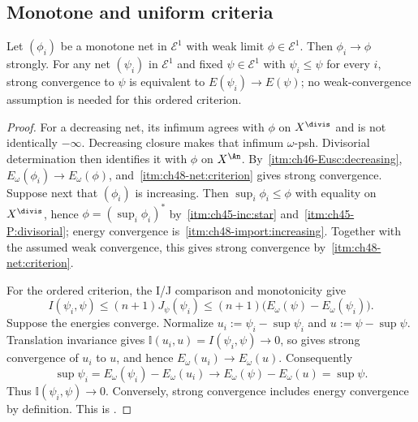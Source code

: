 \subsection{Monotone and uniform criteria}
\label{sec:ch48-monotone}

\begin{proposition}\label{prop:bj-strong-monotone}
Let $(\phi_i)$ be a monotone net in $\mathcal E^1$ with weak limit
$\phi\in\mathcal E^1$. Then $\phi_i\to\phi$ strongly.
For any net $(\psi_i)$ in $\mathcal E^1$ and fixed
$\psi\in\mathcal E^1$ with $\psi_i\le\psi$ for every $i$,
strong convergence to $\psi$ is equivalent to
$E(\psi_i)\to E(\psi)$; no weak-convergence assumption is needed
for this ordered criterion.
\end{proposition}

\begin{proof}
For a decreasing net, its infimum agrees with $\phi$ on
$X^{\divis}$ and is not identically $-\infty$. Decreasing closure
 makes that infimum $\omega$-psh.
Divisorial determination then identifies it with $\phi$ on $X^{\An}$.  By
\,\cref{itm:ch46-Eusc:decreasing},
$E_\omega(\phi_i)\to E_\omega(\phi)$, and
\,\cref{itm:ch48-net:criterion} gives strong
convergence.  Suppose next that $(\phi_i)$ is increasing.  Then
$\sup_i\phi_i\le\phi$ with equality on $X^{\divis}$, hence
$\phi=(\sup_i\phi_i)^*$ by
\,\cref{itm:ch45-inc:star} and
\,\cref{itm:ch45-P:divisorial}; energy
convergence is
\,\cref{itm:ch48-import:increasing}.
Together with the assumed weak convergence, this gives strong convergence
by \,\cref{itm:ch48-net:criterion}.

For the ordered criterion, the I/J comparison and monotonicity give
\[
 I(\psi_i,\psi)\le(n+1)J_\psi(\psi_i)
 \le(n+1)\bigl(E_\omega(\psi)-E_\omega(\psi_i)\bigr).
\]
Suppose the energies converge. Normalize
$u_i:=\psi_i-\sup\psi_i$ and $u:=\psi-\sup\psi$.
Translation invariance gives $\mathbb I(u_i,u)=I(\psi_i,\psi)\to0$,
so  gives strong convergence of $u_i$
to $u$, and hence $E_\omega(u_i)\to E_\omega(u)$. Consequently
\[
 \sup\psi_i=E_\omega(\psi_i)-E_\omega(u_i)
 \longrightarrow E_\omega(\psi)-E_\omega(u)=\sup\psi.
\]
Thus $\mathbb I(\psi_i,\psi)\to0$. Conversely, strong convergence
includes energy convergence by definition. This is
\cite[Proposition~12.6]{BJ22}.

\end{proof}

